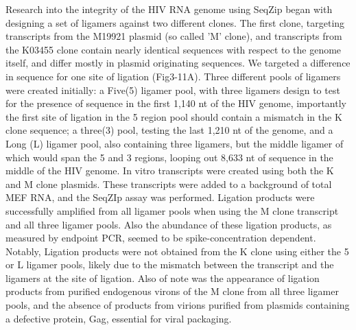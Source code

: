 Research into the integrity of the HIV RNA genome using SeqZip began with designing a set of ligamers against two different clones. The first clone, targeting transcripts from the M19921 plasmid (so called 'M' clone), and transcripts from the K03455 clone contain nearly identical sequences with respect to the genome itself, and differ mostly in plasmid originating sequences. We targeted a difference in sequence for one site of ligation (Fig3-11A). Three different pools of ligamers were created initially: a Five(5) ligamer pool, with three ligamers design to test for the presence of sequence in the first 1,140 nt of the HIV genome, importantly the first site of ligation in the 5 region pool should contain a mismatch in the K clone sequence; a three(3) pool, testing the last 1,210 nt of the genome, and a Long (L) ligamer pool, also containing three ligamers, but the middle ligamer of which would span the 5 and 3 regions, looping out 8,633 nt of sequence in the middle of the HIV genome. In vitro transcripts were created using both the K and M clone plasmids. These transcripts were added to a background of total MEF RNA, and the SeqZIp assay was performed. Ligation products were successfully amplified from all ligamer pools when using the M clone transcript and all three ligamer pools. Also the abundance of these ligation products, as measured by endpoint PCR, seemed to be spike-concentration dependent. Notably, Ligation products were not obtained from the K clone using either the 5 or L ligamer pools, likely due to the mismatch between the transcript and the ligamers at the site of ligation. Also of note was the appearance of ligation products from purified endogenous virons of the M clone from all three ligamer pools, and the absence of products from virions purified from plasmids containing a defective protein, Gag, essential for viral packaging. 

